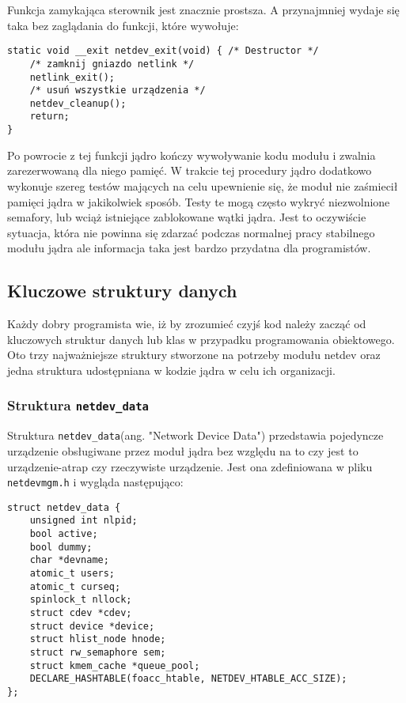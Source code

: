 \documentclass[10pt]{article}
\begin{document}
\newpage
Funkcja zamykająca sterownik jest znacznie prostsza. A przynajmniej wydaje się taka bez zaglądania do funkcji, które wywołuje:

\begin{verbatim}
static void __exit netdev_exit(void) { /* Destructor */
    /* zamknij gniazdo netlink */
    netlink_exit();
    /* usuń wszystkie urządzenia */
    netdev_cleanup();
    return;
}
\end{verbatim}

Po powrocie z tej funkcji jądro kończy wywoływanie kodu modułu i zwalnia zarezerwowaną dla niego pamięć. W trakcie tej procedury jądro dodatkowo wykonuje szereg testów mających na celu upewnienie się, że moduł nie zaśmiecił pamięci jądra w jakikolwiek sposób. Testy te mogą często wykryć niezwolnione semafory, lub wciąż istniejące zablokowane wątki jądra. Jest to oczywiście sytuacja, która nie powinna się zdarzać podczas normalnej pracy stabilnego modułu jądra ale informacja taka jest bardzo przydatna dla programistów.
\subsection{Kluczowe struktury danych}
\label{mainstructs}

Każdy dobry programista wie, iż by zrozumieć czyjś kod należy zacząć od kluczowych struktur danych lub klas w przypadku programowania obiektowego. Oto trzy najważniejsze struktury stworzone na potrzeby modułu netdev oraz jedna struktura udostępniana w kodzie jądra w celu ich organizacji.

\subsubsection{Struktura \texttt{\large{netdev\_data}}}

Struktura \texttt{netdev\_data}(ang. "Network Device Data") przedstawia pojedyncze urządzenie obsługiwane przez moduł jądra bez względu na to czy jest to urządzenie-atrap czy rzeczywiste urządzenie.  Jest ona zdefiniowana w pliku \texttt{netdevmgm.h} i wygląda następująco:

\begin{verbatim}
struct netdev_data {
    unsigned int nlpid;
    bool active;
    bool dummy;
    char *devname;
    atomic_t users;
    atomic_t curseq;
    spinlock_t nllock;
    struct cdev *cdev;
    struct device *device;
    struct hlist_node hnode;
    struct rw_semaphore sem;
    struct kmem_cache *queue_pool;
    DECLARE_HASHTABLE(foacc_htable, NETDEV_HTABLE_ACC_SIZE);
};
\end{verbatim}
\end{document}

